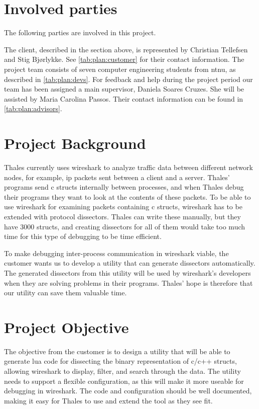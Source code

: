 \section{Involved parties}
The following parties are involved in this project.

The client, described in the section above, is represented by Christian Tellefsen and Stig Bjørlykke. See \autoref{tab:plan:customer} for their contact information.
The project team consists of seven computer engineering students from \Gls{ntnu}, as described in \autoref{tab:plan:devs}.
For feedback and help during the project period our team has been assigned a main supervisor, Daniela Soares Cruzes.
She will be assisted by Maria Carolina Passos. Their contact information can be found in \autoref{tab:plan:advisors}.

\section{Project Background}
Thales currently uses \Gls{wireshark} to analyze traffic data between different network nodes, for example, \Gls{ip} \glspl{packet} sent between a client and a server.
Thales' programs send \Gls{c} \glspl{struct} internally between processes, and when Thales debug their programs they want to look at the contents of these \glspl{packet}.
To be able to use \Gls{wireshark} for examining \glspl{packet} containing \Gls{c} \glspl{struct}, \Gls{wireshark} has to be extended with \gls{protocol} \glspl{dissector}.
Thales can write these manually, but they have 3000 \glspl{struct}, and creating \glspl{dissector} for
all of them would take too much time for this type of debugging to be time efficient. 

To make debugging inter-process communication in \Gls{wireshark} viable, the customer wants us to develop a \gls{utility} that can generate \glspl{dissector} automatically.
The generated \glspl{dissector} from this \gls{utility} will be used by \Gls{wireshark}'s developers when they are solving problems in their programs.
Thales' hope is therefore that our \gls{utility} can save them valuable time.

\section{Project Objective}
The objective from the customer is to design a \gls{utility} that will be able to generate \Gls{lua} code for dissecting the \gls{binary} representation
of \Gls{c}/\Gls{c++} \glspl{struct}, allowing \Gls{wireshark} to display, filter, and search through the data.
The \gls{utility} needs to support a flexible configuration, as this will make it more useable for debugging in \Gls{wireshark}. 
The code and configuration should be well documented, making it easy for Thales to use and extend the tool as they see fit.

